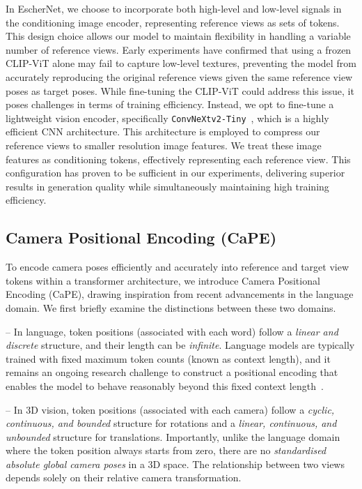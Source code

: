 \documentclass[10pt,twocolumn,letterpaper]{article}
\begin{document}
In EscherNet, we choose to incorporate both high-level and low-level signals in the conditioning image encoder, representing reference views as sets of tokens. This design choice allows our model to maintain flexibility in handling a variable number of reference views. Early experiments have confirmed that using a frozen CLIP-ViT alone may fail to capture low-level textures, preventing the model from accurately reproducing the original reference views given the same reference view poses as target poses. While fine-tuning the CLIP-ViT could address this issue, it poses challenges in terms of training efficiency. Instead, we opt to fine-tune a lightweight vision encoder, specifically {\tt ConvNeXtv2-Tiny}~\cite{woo2023convnextv2}, which is a highly efficient CNN architecture. This architecture is employed to compress our reference views to smaller resolution image features. We treat these image features as conditioning tokens, effectively representing each reference view. This configuration has proven to be sufficient in our experiments, delivering superior results in generation quality while simultaneously maintaining high training efficiency.

\subsection{Camera Positional Encoding (CaPE)}

To encode camera poses efficiently and accurately into reference and target view tokens within a transformer architecture, we introduce Camera Positional Encoding (CaPE), drawing inspiration from recent advancements in the language domain.  We first briefly examine the distinctions between these two domains.


-- In language, token positions (associated with each word) follow a {\it linear and discrete} structure, and their length can be {\it infinite}. Language models are typically trained with fixed maximum token counts (known as context length), and it remains an ongoing research challenge to construct a positional encoding that enables the model to behave reasonably beyond this fixed context length~\cite{peng2023yarn,han2023lm}.

-- In 3D vision, token positions (associated with each camera) follow a {\it cyclic, continuous, and bounded} structure for rotations and a {\it linear, continuous, and unbounded} structure for translations. Importantly, unlike the language domain where the token position always starts from zero, there are no {\it standardised absolute global camera poses} in a 3D space. The relationship between two views depends solely on their relative camera transformation.
\end{document}
